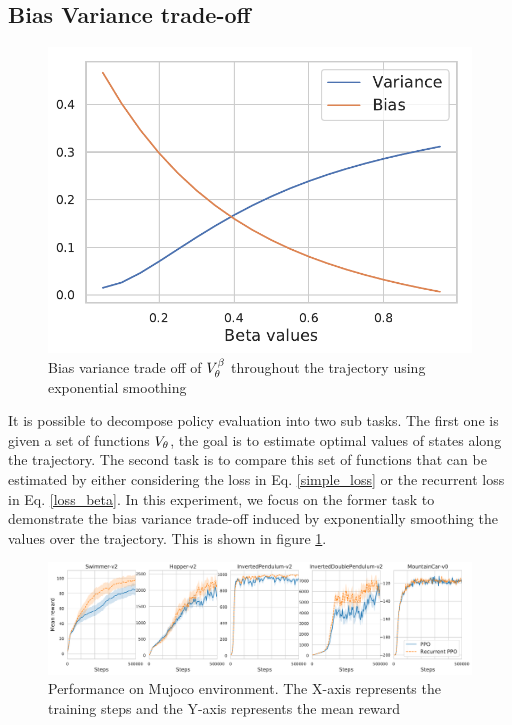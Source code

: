 \subsection{Bias Variance trade-off}
\begin{figure}[h]
    \centering
    \includegraphics[scale=0.45]{fig/beta_bias_variance.pdf}
    \caption{Bias variance trade off of $V^{\beta}_{\theta}$ throughout the trajectory using exponential smoothing}
    \label{fig:bias_variance}
\end{figure}
It is possible to decompose policy evaluation into two sub tasks. The first one is given a set of functions $V_{\theta}$, the goal is to estimate optimal values of states along the trajectory. The second task is to compare this set of functions that can be estimated by either considering the loss in Eq. \ref{simple_loss} or the recurrent loss in Eq. \ref{loss_beta}. In this experiment, we focus on the former task to demonstrate the bias variance trade-off induced by exponentially smoothing the values over the trajectory. This is shown in figure \ref{fig:bias_variance}. 
\begin{figure}[t]
    \centering
    \includegraphics[scale=0.39]{fig/reward_mujoco.pdf}
    \caption{Performance on Mujoco environment. The X-axis represents the training steps and the Y-axis represents the mean reward}
    \label{fig:perf_mujoco}
\end{figure}
